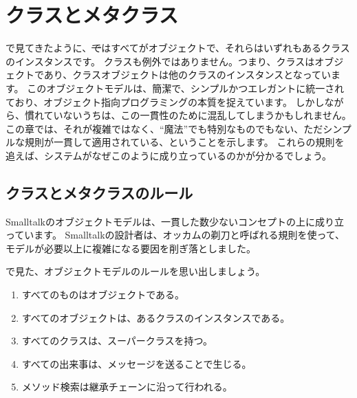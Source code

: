 \documentclass[a4paper,10pt,twoside]{book}
\begin{document}
	\renewcommand{\nnbb}[2]{} %
	\sloppy
\fi
\chapter{クラスとメタクラス}


で見てきたように、\st ではすべてがオブジェクトで、それらはいずれもあるクラスのインスタンスです。
クラスも例外ではありません。つまり、クラスはオブジェクトであり、クラスオブジェクトは他のクラスのインスタンスとなっています。
このオブジェクトモデルは、簡潔で、シンプルかつエレガントに統一されており、オブジェクト指向プログラミングの本質を捉えています。
しかしながら、慣れていないうちは、この一貫性のために混乱してしまうかもしれません。この章では、それが複雑ではなく、``魔法''でも特別なものでもない、ただシンプルな規則が一貫して適用されている、ということを示します。
これらの規則を追えば、システムがなぜこのように成り立っているのかが分かるでしょう。

\section{クラスとメタクラスのルール}

Smalltalkのオブジェクトモデルは、一貫した数少ないコンセプトの上に成り立っています。
Smalltalkの設計者は、オッカムの剃刀と呼ばれる規則を使って、モデルが必要以上に複雑になる要因を削ぎ落としました。

で見た、オブジェクトモデルのルールを思い出しましょう。

\begin{enumerate}[label={\textbf{Rule \arabic{*}}.}, ref={Rule \arabic{*}}, leftmargin=*, widest=10]
\item{} %
	すべてのものはオブジェクトである。

\item{} %
	すべてのオブジェクトは、あるクラスのインスタンスである。

\item{} %
	すべてのクラスは、スーパークラスを持つ。

\item{} %
	すべての出来事は、メッセージを送ることで生じる。

\item{} %
	メソッド検索は継承チェーンに沿って行われる。

\end{enumerate}
\end{document}
